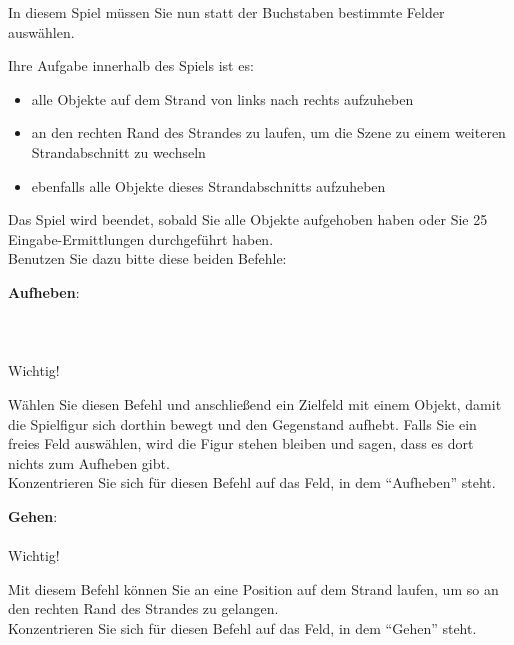 \documentclass[12pt,fleqn]{scrreprt}
\begin{document}
In diesem Spiel müssen Sie nun statt der Buchstaben bestimmte Felder auswählen.

Ihre Aufgabe innerhalb des Spiels ist es:
\begin{itemize}
\item alle Objekte auf dem Strand von links nach rechts aufzuheben
\item an den rechten Rand des Strandes zu laufen, um die Szene zu einem weiteren Strand\-abschnitt zu wechseln
\item ebenfalls alle Objekte dieses Strandabschnitts aufzuheben
\end{itemize}

Das Spiel wird beendet, sobald Sie alle Objekte aufgehoben haben oder Sie 25 Eingabe-Ermittlungen durchgeführt haben.\\

Benutzen Sie dazu bitte diese beiden Befehle:\\

\begin{minipage}[b]{0.13\linewidth}	
\textbf{Aufheben}: \\ \\ \\ \\ 
Wichtig!\\

\end{minipage}
\quad
\begin{minipage}[b]{0.79\linewidth}
Wählen Sie diesen Befehl und anschließend ein Zielfeld mit einem Objekt, damit die Spielfigur sich dorthin bewegt und den Gegenstand aufhebt.
Falls Sie ein freies Feld auswählen, wird die Figur stehen bleiben und sagen, dass es dort nichts zum Aufheben gibt.\\
Konzentrieren Sie sich für diesen Befehl auf das Feld, in dem "`Aufheben"' steht.
\end{minipage}

\vspace{1.25cm}

\begin{minipage}[b]{0.13\linewidth}	
\textbf{Gehen}: \\ \\ 
Wichtig! \\

\end{minipage}
\quad
\begin{minipage}[b]{0.79\linewidth}
Mit diesem Befehl können Sie an eine Position auf dem Strand laufen, um so an den rechten Rand des Strandes zu gelangen.\\
Konzentrieren Sie sich für diesen Befehl auf das Feld, in dem "`Gehen"' steht.
\end{minipage}
\end{document}
